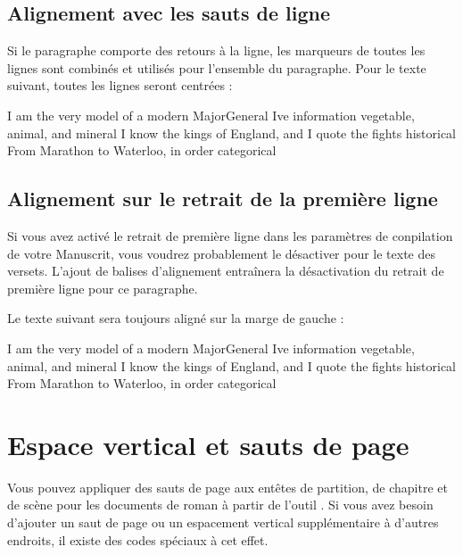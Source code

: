 \documentclass[a4paper,11pt,french]{sphinxmanual}
\begin{document}
\subsection{Alignement avec les sauts de ligne}
\label{\detokenize{usage_format:alignment-with-line-breaks}}
\sphinxAtStartPar
Si le paragraphe comporte des retours à la ligne, les marqueurs de toutes les lignes sont combinés et utilisés pour l’ensemble du paragraphe. Pour le texte suivant, toutes les lignes seront centrées :

\begin{sphinxVerbatim}[commandchars=\\\{\}]
\PYGZgt{}\PYGZgt{} I am the very model of a modern Major\PYGZhy{}General
I\PYGZsq{}ve information vegetable, animal, and mineral
I know the kings of England, and I quote the fights historical
From Marathon to Waterloo, in order categorical \PYGZlt{}\PYGZlt{}
\end{sphinxVerbatim}


\subsection{Alignement sur le retrait de la première ligne}
\label{\detokenize{usage_format:alignment-with-first-line-indent}}
\sphinxAtStartPar
Si vous avez activé le retrait de première ligne dans les paramètres de conpilation de votre Manuscrit, vous voudrez probablement le désactiver pour le texte des versets. L’ajout de balises d’alignement entraînera la désactivation du retrait de première ligne pour ce paragraphe.

\sphinxAtStartPar
Le texte suivant sera toujours aligné sur la marge de gauche :

\begin{sphinxVerbatim}[commandchars=\\\{\}]
I am the very model of a modern Major\PYGZhy{}General \PYGZlt{}\PYGZlt{}
I\PYGZsq{}ve information vegetable, animal, and mineral
I know the kings of England, and I quote the fights historical
From Marathon to Waterloo, in order categorical
\end{sphinxVerbatim}


\section{Espace vertical et sauts de page}
\label{\detokenize{usage_format:vertical-space-and-page-breaks}}\label{\detokenize{usage_format:a-fmt-break}}
\sphinxAtStartPar
Vous pouvez appliquer des sauts de page aux en\sphinxhyphen{}têtes de partition, de chapitre et de scène pour les documents de roman à partir de l’outil . Si vous avez besoin d’ajouter un saut de page ou un espacement vertical supplémentaire à d’autres endroits, il existe des codes spéciaux à cet effet.
\end{document}
